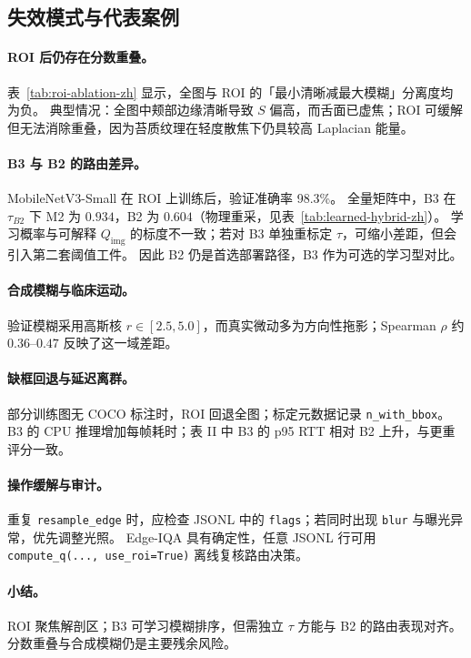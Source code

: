 \subsection{失效模式与代表案例}
\label{sec:failure-cases-zh}

\paragraph{ROI 后仍存在分数重叠。}
表~\ref{tab:roi-ablation-zh} 显示，全图与 ROI 的「最小清晰减最大模糊」分离度均为负。
典型情况：全图中颊部边缘清晰导致 $S$ 偏高，而舌面已虚焦；ROI 可缓解但无法消除重叠，因为苔质纹理在轻度散焦下仍具较高 Laplacian 能量。

\paragraph{B3 与 B2 的路由差异。}
MobileNetV3-Small 在 ROI 上训练后，验证准确率 98.3\%。
全量矩阵中，B3 在 $\tau_{B2}$ 下 M2 为 $0.934$，B2 为 $0.604$（物理重采，见表~\ref{tab:learned-hybrid-zh}）。
学习概率与可解释 $Q_{\mathrm{img}}$ 的标度不一致；若对 B3 单独重标定 $\tau$，可缩小差距，但会引入第二套阈值工件。
因此 B2 仍是首选部署路径，B3 作为可选的学习型对比。

\paragraph{合成模糊与临床运动。}
验证模糊采用高斯核 $r{\in}[2.5,5.0]$，而真实微动多为方向性拖影；Spearman $\rho$ 约 $0.36$--$0.47$ 反映了这一域差距。

\paragraph{缺框回退与延迟离群。}
部分训练图无 COCO 标注时，ROI 回退全图；标定元数据记录 \texttt{n\_with\_bbox}。
B3 的 CPU 推理增加每帧耗时；表 II 中 B3 的 p95 RTT 相对 B2 上升，与更重评分一致。

\paragraph{操作缓解与审计。}
重复 \texttt{resample\_edge} 时，应检查 JSONL 中的 \texttt{flags}；若同时出现 \texttt{blur} 与曝光异常，优先调整光照。
Edge-IQA 具有确定性，任意 JSONL 行可用 \texttt{compute\_q(..., use\_roi=True)} 离线复核路由决策。

\paragraph{小结。}
ROI 聚焦解剖区；B3 可学习模糊排序，但需独立 $\tau$ 方能与 B2 的路由表现对齐。
分数重叠与合成模糊仍是主要残余风险。
